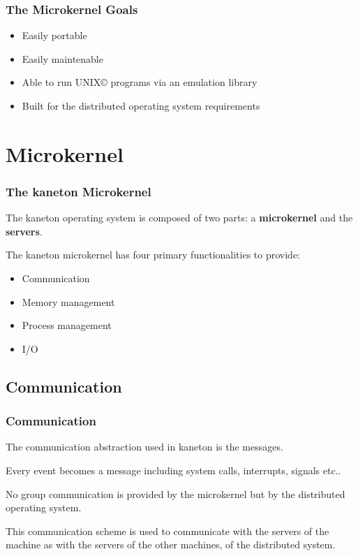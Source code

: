 \documentclass[8pt]{beamer}
\newcommand{\nl}[0]{\vspace{0.4cm}}
\begin{document}

\begin{frame}
  \frametitle{The Microkernel Goals}

  \begin{itemize}[<+->]
    \item
      Easily portable
    \item
      Easily maintenable
    \item
      Able to run UNIX{\scriptsize \copyright} programs via
      an emulation library
    \item
      Built for the distributed operating system requirements
  \end{itemize}
\end{frame}

%
%

\section{Microkernel}


\begin{frame}
  \frametitle{The kaneton Microkernel}

  The kaneton operating system is composed of two parts: a
  \textbf{microkernel} and the \textbf{servers}.

  \nl

  The kaneton microkernel has four primary functionalities
  to provide:

  \begin{itemize}[<+->]
    \item
      Communication
    \item
      Memory management
    \item
      Process management
    \item
      I/O
  \end{itemize}
\end{frame}

%
%

\subsection{Communication}


\begin{frame}
  \frametitle{Communication}

  The communication abstraction used in kaneton is the messages.

  \nl

  Every event becomes a message including system calls, interrupts,
  signals etc..

  \nl

  No group communication is provided by the microkernel but by the distributed
  operating system.

  \nl

  This communication scheme is used to communicate with the servers
  of the machine as with the servers of the other machines, of
  the distributed system.
\end{frame}
\end{document}
